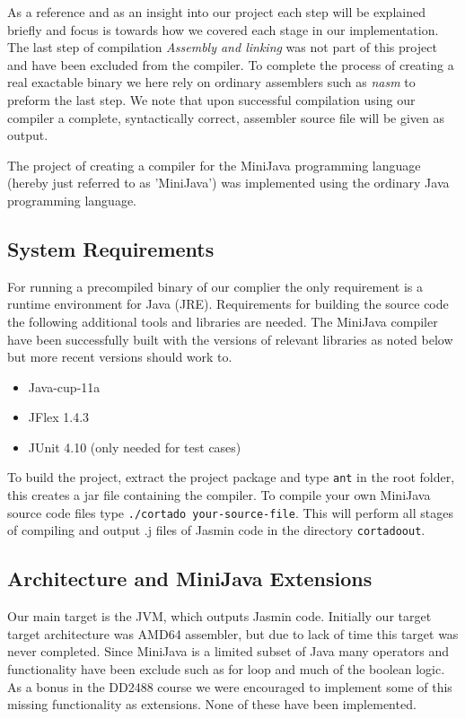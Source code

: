 \documentclass[11pt]{amsart}
\begin{document}
As a reference and as an insight into our project each step will be explained briefly and focus is towards how we covered each stage in our implementation. The last step of compilation \textit{Assembly and linking} was not part of this project and have been excluded from the compiler. To complete the process of creating a real exactable binary we here rely on ordinary assemblers such as \textit{nasm}\cite{nasm} to preform the last step. We note that upon successful compilation using our compiler a complete, syntactically correct, assembler source file will be given as output.

The project of creating a compiler for the MiniJava programming language (hereby just referred to as 'MiniJava') was implemented using the ordinary Java programming language. 

\subsection{System Requirements}
For running a precompiled binary of our complier the only requirement is a runtime environment for Java (JRE). Requirements for building the source code the following additional tools and libraries are needed. The MiniJava compiler have been successfully built with the versions of relevant libraries as noted below but more recent versions should work to.

\begin{itemize}
\item Java-cup-11a
\item JFlex 1.4.3
\item JUnit 4.10 (only needed for test cases)
\end{itemize}

To build the project, extract the project package and type \texttt{ant} in the root folder, this creates a jar file containing the compiler. To compile your own MiniJava source code files type \texttt{./cortado your-source-file}. This will perform all stages of compiling and output .j files of Jasmin code in the directory \texttt{cortadoout}.

\subsection{Architecture and MiniJava Extensions}
Our main target is the JVM, which outputs Jasmin code. Initially our target target architecture was AMD64 assembler, but due to lack of time this target was never completed. Since MiniJava is a limited subset of Java many operators and functionality have been exclude such as for loop and much of the boolean logic. As a bonus in the DD2488 course we were encouraged to implement some of this missing functionality as extensions. None of these have been implemented.
\end{document}
